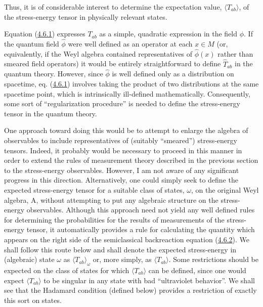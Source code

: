\documentclass[11pt,a4paper]{article}
\begin{document}
Thus, it is of considerable interest to determine the expectation value, \(\langle T_{ab}\rangle \), of the stress-energy tensor in physically relevant states.

Equation (\hyperref[eq:4.6.1]{4.6.1}) expresses \(T_{ab}\) as a simple, quadratic expression in the field \(\phi\). If the quantum field \(\hat{\phi}\) were well defined as an operator at each \(x\in M\) (or, equivalently, if the Weyl algebra contained representatives of \(\hat{\phi}(x)\) rather than smeared field operators) it would be entirely straightforward to define \(\hat{T}_{ab}\) in the quantum theory. However, since \(\hat{\phi}\) is well defined only as a distribution on spacetime, eq. (\hyperref[eq:4.6.1]{4.6.1}) involves taking the product of two distributions at the same spacetime point, which is intrinsically ill-defined mathematically. Consequently, some sort of ``regularization procedure'' is needed to define the stress-energy tensor in the quantum theory.

One approach toward doing this would be to attempt to enlarge the algebra of observables to include representatives of (suitably ``smeared'') stress-energy tensors. Indeed, it probably would be necessary to proceed in this manner in order to extend the rules of measurement theory described in the previous section to the stress-energy observables. However, I am not aware of any significant progress in this direction. Alternatively, one could simply seek to define the expected stress-energy tensor for a suitable class of states, \(\omega\), on the original Weyl algebra, A, without attempting to put any algebraic structure on the stress-energy observables. Although this approach need not yield any well defined rules for determining the probabilities for the results of measurements of the stress-energy tensor, it automatically provides a rule for calculating the quantity which appears on the right side of the semiclassical backreaction equation (\hyperref[eq:4.6.2]{4.6.2}). We shall follow this route below and shall denote the expected stress-energy in (algebraic) state \(\omega\) as \(\langle T_{ab} \rangle_{\omega}\) \hypertarget{source-100}{} or, more simply, as \(\langle T_{ab}\rangle \). Some restrictions should be expected on the class of states for which \(\langle T_{ab}\rangle \) can be defined, since one would expect \(\langle T_{ab}\rangle \) to be singular in any state with bad ``ultraviolet behavior''. We shall see that the Hadamard condition (defined below) provides a restriction of exactly this sort on states.
\end{document}
